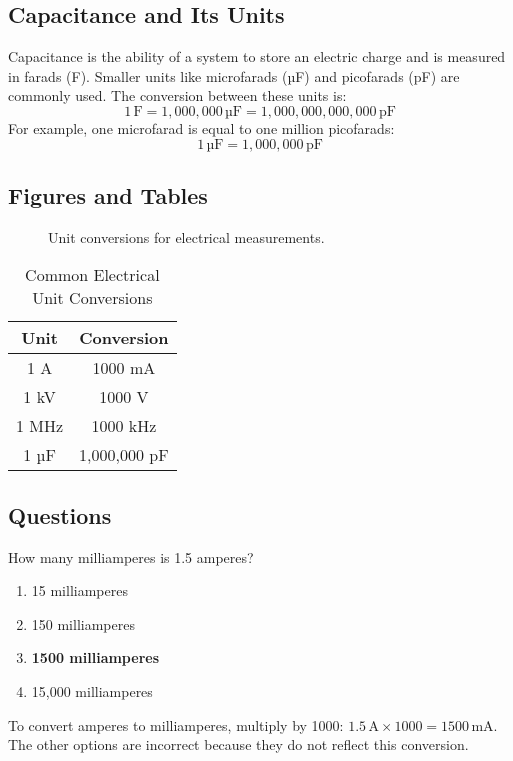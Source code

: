 \subsection*{Capacitance and Its Units}
Capacitance is the ability of a system to store an electric charge and is measured in farads (F). Smaller units like microfarads (µF) and picofarads (pF) are commonly used. The conversion between these units is:
\begin{equation}
1 \, \text{F} = 1,000,000 \, \text{µF} = 1,000,000,000,000 \, \text{pF}
\end{equation}
For example, one microfarad is equal to one million picofarads:
\begin{equation}
1 \, \text{µF} = 1,000,000 \, \text{pF}
\end{equation}

\subsection*{Figures and Tables}
\begin{figure}[h]
    \centering
    \caption{Unit conversions for electrical measurements.}
    \label{fig:unit_conversions}
\end{figure}

\begin{table}[h]
    \centering
    \caption{Common Electrical Unit Conversions}
    \label{tab:unit_conversions}
    \begin{tabular}{|c|c|}
        \hline
        \textbf{Unit} & \textbf{Conversion} \\
        \hline
        1 A & 1000 mA \\
        1 kV & 1000 V \\
        1 MHz & 1000 kHz \\
        1 µF & 1,000,000 pF \\
        \hline
    \end{tabular}
\end{table}

\subsection*{Questions}
\begin{tcolorbox}[colback=gray!10!white,colframe=black!75!black,title={T5B01}]
    How many milliamperes is 1.5 amperes?
    \begin{enumerate}[label=\Alph*,noitemsep]
        \item 15 milliamperes
        \item 150 milliamperes
        \item \textbf{1500 milliamperes}
        \item 15,000 milliamperes
    \end{enumerate}
\end{tcolorbox}
To convert amperes to milliamperes, multiply by 1000: \(1.5 \, \text{A} \times 1000 = 1500 \, \text{mA}\). The other options are incorrect because they do not reflect this conversion.


